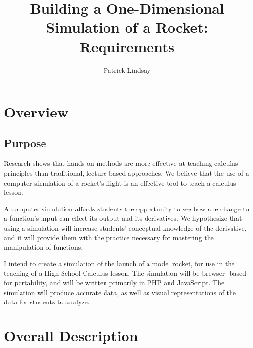 \documentclass{report}
\author{Patrick Lindsay}
\title{Building a One-Dimensional Simulation of a Rocket: Requirements}
\begin{document}
\maketitle

\chapter{Overview}
	\section{Purpose}
		 Research shows that hands-on methods are more effective at teaching calculus principles than traditional, lecture-based approaches.  We believe that the use of a computer simulation of a rocket’s flight is an effective tool to teach a calculus lesson.

		A computer simulation affords students the opportunity to see how one change to a function’s input can effect its output and its derivatives.  We hypothesize that using a simulation will increase students’ conceptual knowledge of the derivative, and it will provide them with the practice necessary for mastering the manipulation of functions.

		I intend to create a simulation of the launch of a model rocket, for use in the teaching of a High School Calculus lesson. The simulation will be browser- based for portability, and will be written primarily in PHP and JavaScript.  The simulation will produce accurate data, as well as visual representations of the data for students to analyze.

\chapter{Overall Description}
\end{document}
